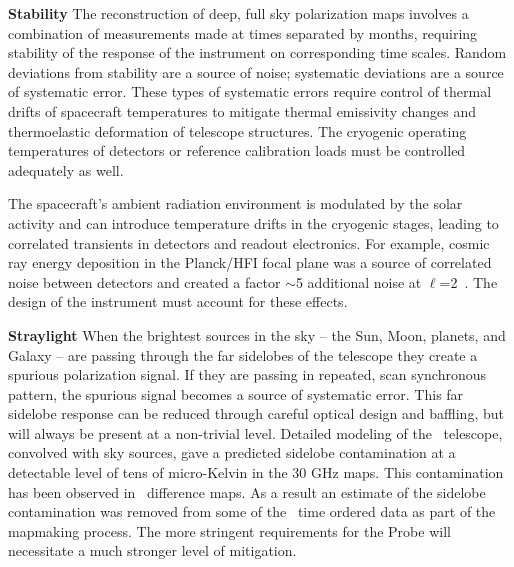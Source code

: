 \textbf{Stability}  %
The reconstruction of deep, full sky polarization maps involves a combination of measurements made at times
separated by months, requiring stability of the response of the instrument on corresponding time scales.  
Random deviations
from stability are a source of noise; systematic deviations are a source of systematic error. 
These types of systematic errors require control of thermal drifts of spacecraft temperatures to
mitigate thermal emissivity changes and thermoelastic deformation of telescope structures.  
The cryogenic operating temperatures of detectors or reference calibration loads must be controlled
adequately as well. 

The spacecraft's ambient radiation environment is modulated by the solar activity and
can introduce temperature drifts in the cryogenic stages, leading to correlated transients in detectors and readout electronics.  
For example, cosmic ray energy deposition in the Planck/HFI focal plane was a source of 
correlated noise between detectors and created a factor $\sim$5 
additional noise at $\ell$=2~\cite{planck2016_xlvi}.
The design of the instrument must account for these effects.

\textbf{Straylight}   When the brightest sources in the sky -- the Sun, Moon, planets, and Galaxy --
are passing through the far sidelobes of the telescope they create a spurious polarization signal. If they are 
passing in repeated, scan synchronous pattern, the spurious signal becomes a source of systematic error. 
This far sidelobe response can be reduced through careful optical design and baffling, but will always be present 
at a non-trivial level.  Detailed modeling of the \planck\ telescope, convolved with sky sources, gave 
a predicted sidelobe contamination at a detectable level of tens of micro-Kelvin in the 30 GHz maps.  This
contamination has been observed in \planck\ difference maps.  
As a result an estimate of the sidelobe contamination was removed from some of the \planck\ time ordered data 
as part of the mapmaking process. The more stringent requirements for the Probe will necessitate a much 
stronger level of mitigation.  

